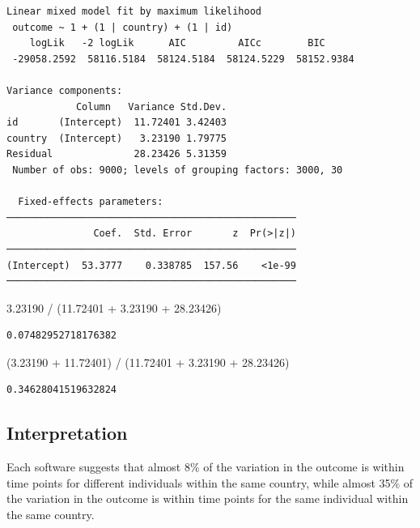 \documentclass[
  letterpaper,
  DIV=11,
  numbers=noendperiod]{scrreprt}
\newenvironment{Shaded}{\begin{snugshade}}{\end{snugshade}}
\newcommand{\FloatTok}[1]{\textcolor[rgb]{0.68,0.00,0.00}{#1}}
\newcommand{\NormalTok}[1]{\textcolor[rgb]{0.00,0.23,0.31}{#1}}
\newcommand{\OperatorTok}[1]{\textcolor[rgb]{0.37,0.37,0.37}{#1}}
\begin{document}
\begin{verbatim}
Linear mixed model fit by maximum likelihood
 outcome ~ 1 + (1 | country) + (1 | id)
    logLik   -2 logLik      AIC         AICc        BIC     
 -29058.2592  58116.5184  58124.5184  58124.5229  58152.9384

Variance components:
            Column   Variance Std.Dev.
id       (Intercept)  11.72401 3.42403
country  (Intercept)   3.23190 1.79775
Residual              28.23426 5.31359
 Number of obs: 9000; levels of grouping factors: 3000, 30

  Fixed-effects parameters:
──────────────────────────────────────────────────
               Coef.  Std. Error       z  Pr(>|z|)
──────────────────────────────────────────────────
(Intercept)  53.3777    0.338785  157.56    <1e-99
──────────────────────────────────────────────────
\end{verbatim}

\begin{Shaded}
\begin{Highlighting}[]

\FloatTok{3.23190} \OperatorTok{/}\NormalTok{ (}\FloatTok{11.72401} \OperatorTok{+} \FloatTok{3.23190} \OperatorTok{+} \FloatTok{28.23426}\NormalTok{)}
\end{Highlighting}
\end{Shaded}

\begin{verbatim}
0.07482952718176382
\end{verbatim}

\begin{Shaded}
\begin{Highlighting}[]

\NormalTok{(}\FloatTok{3.23190} \OperatorTok{+} \FloatTok{11.72401}\NormalTok{) }\OperatorTok{/}\NormalTok{ (}\FloatTok{11.72401} \OperatorTok{+} \FloatTok{3.23190} \OperatorTok{+} \FloatTok{28.23426}\NormalTok{)}
\end{Highlighting}
\end{Shaded}

\begin{verbatim}
0.34628041519632824
\end{verbatim}

\subsection{Interpretation}\label{interpretation-2}

Each software suggests that almost 8\% of the variation in the outcome
is within time points for different individuals within the same country,
while almost 35\% of the variation in the outcome is within time points
for the same individual within the same country.
\end{document}
